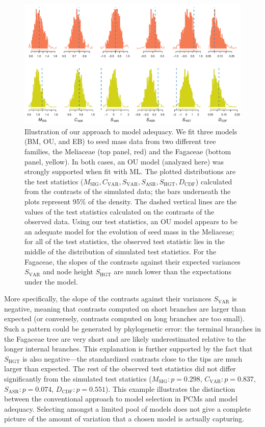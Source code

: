 \begin{figure}[p]
  \centering
  \includegraphics[width=\textwidth]{figs/two-clades}
  \caption[Seed mass evolution in Meliaceae and Fagaceae]{Illustration of our approach to model adequacy. We fit three models (BM, OU, and EB) to seed mass data from two different tree families, the Meliaceae (top panel, red) and the Fagaceae (bottom panel, yellow). In both cases, an OU model (analyzed here) was strongly supported when fit with ML. The plotted distributions are the test statistics ($M_{\text{SIG}}, C_{\text{VAR}}, S_{\text{VAR}}, S_{\text{ASR}}, S_{\text{HGT}}, D_{\text{CDF}}$) calculated from the contrasts of the simulated data; the bars underneath the plots represent 95\% of the density. The dashed vertical lines are the values of the test statistics calculated on the contrasts of the observed data. Using our test statistics, an OU model appears to be an adequate model for the evolution of seed mass in the Meliaceae; for all of the test statistics, the observed test statistic lies in the middle of the distribution of simulated test statistics. For the Fagaceae, the slopes of the contrasts against their expected variances $S_{\text{VAR}}$ and node height $S_{\text{HGT}}$ are much lower than the expectations under the model.}
  \label{fig:two-clades}
\end{figure}


More specifically, the slope of the contrasts against their variances $S_{\text{VAR}}$ is negative, meaning that contrasts computed on short branches are larger than expected (or conversely, contrasts computed on long branches are too small). Such a pattern could be generated by phylogenetic error: the terminal branches in the Fagaceae tree are very short and are likely underestimated relative to the longer internal branches. This explanation is further supported by the fact that $S_{\text{HGT}}$ is also negative---the standardized contrasts close to the tips are much larger than expected. The rest of the observed test statistics did not differ significantly from the simulated test statistics ($M_{\text{SIG}}: p=\text{0.298}$, $C_{\text{VAR}}:p=\text{0.837}$, $S_{\text{ASR}}:p=\text{0.074}$, $D_{\text{CDF}}: p=\text{0.551}$). This example illustrates the distinction between the conventional approach to model selection in PCMs and model adequacy. Selecting amongst a limited pool of models does not give a complete picture of the amount of variation that a chosen model is actually capturing.


